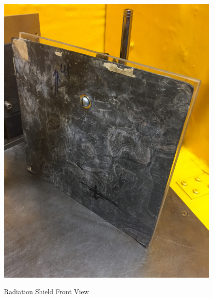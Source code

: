 \documentclass{../lab}
\begin{document}
\begin{figure}[H]
\begin{minipage}{.49\linewidth}
    \centering
    \href{http://experimentationlab.berkeley.edu/sites/default/files/Shield-Front.JPG}{\includegraphics[width=\linewidth,keepaspectratio]{images/Shield-Front.JPG}} \\
    \caption{Radiation Shield Front View}
\end{minipage}\hfill
\begin{minipage}{.49\linewidth}
    \centering

\end{minipage}
\end{figure}
\end{document}

